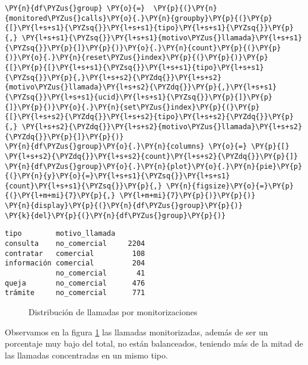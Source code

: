     \begin{tcolorbox}[breakable, size=fbox, boxrule=1pt, pad at break*=1mm,colback=cellbackground, colframe=cellborder]
\begin{Verbatim}[commandchars=\\\{\}]
\PY{n}{df\PYZus{}group} \PY{o}{=}  \PY{p}{(}\PY{n}{monitored\PYZus{}calls}\PY{o}{.}\PY{n}{groupby}\PY{p}{(}\PY{p}{[}\PY{l+s+s1}{\PYZsq{}}\PY{l+s+s1}{tipo}\PY{l+s+s1}{\PYZsq{}}\PY{p}{,} \PY{l+s+s1}{\PYZsq{}}\PY{l+s+s1}{motivo\PYZus{}llamada}\PY{l+s+s1}{\PYZsq{}}\PY{p}{]}\PY{p}{)}\PY{o}{.}\PY{n}{count}\PY{p}{(}\PY{p}{)}\PY{o}{.}\PY{n}{reset\PYZus{}index}\PY{p}{(}\PY{p}{)}\PY{p}{[}\PY{p}{[}\PY{l+s+s1}{\PYZsq{}}\PY{l+s+s1}{tipo}\PY{l+s+s1}{\PYZsq{}}\PY{p}{,}\PY{l+s+s2}{\PYZdq{}}\PY{l+s+s2}{motivo\PYZus{}llamada}\PY{l+s+s2}{\PYZdq{}}\PY{p}{,}\PY{l+s+s1}{\PYZsq{}}\PY{l+s+s1}{ucid}\PY{l+s+s1}{\PYZsq{}}\PY{p}{]}\PY{p}{]}\PY{p}{)}\PY{o}{.}\PY{n}{set\PYZus{}index}\PY{p}{(}\PY{p}{[}\PY{l+s+s2}{\PYZdq{}}\PY{l+s+s2}{tipo}\PY{l+s+s2}{\PYZdq{}}\PY{p}{,} \PY{l+s+s2}{\PYZdq{}}\PY{l+s+s2}{motivo\PYZus{}llamada}\PY{l+s+s2}{\PYZdq{}}\PY{p}{]}\PY{p}{)}
\PY{n}{df\PYZus{}group}\PY{o}{.}\PY{n}{columns} \PY{o}{=} \PY{p}{[} \PY{l+s+s2}{\PYZdq{}}\PY{l+s+s2}{count}\PY{l+s+s2}{\PYZdq{}}\PY{p}{]}
\PY{n}{df\PYZus{}group}\PY{o}{.}\PY{n}{plot}\PY{o}{.}\PY{n}{pie}\PY{p}{(}\PY{n}{y}\PY{o}{=}\PY{l+s+s1}{\PYZsq{}}\PY{l+s+s1}{count}\PY{l+s+s1}{\PYZsq{}}\PY{p}{,} \PY{n}{figsize}\PY{o}{=}\PY{p}{(}\PY{l+m+mi}{7}\PY{p}{,} \PY{l+m+mi}{7}\PY{p}{)}\PY{p}{)}
\PY{n}{display}\PY{p}{(}\PY{n}{df\PYZus{}group}\PY{p}{)}
\PY{k}{del}\PY{p}{(}\PY{n}{df\PYZus{}group}\PY{p}{)}
\end{Verbatim}
\end{tcolorbox}
    \begin{verbatim}
tipo        motivo_llamada       
consulta    no_comercial     2204
contratar   comercial         108
información comercial         204
            no_comercial       41
queja       no_comercial      476
trámite     no_comercial      771
    \end{verbatim}

    
      
\begin{figure}[!ht]
	\centering
    \caption{Distribución de llamadas por monitorizaciones}
    \label{fig:distmoni}
\end{figure}
    
 Observamos en la figura \ref{fig:distmoni} las llamadas monitorizadas, además de ser un porcentaje muy bajo del total, no están balanceados, teniendo más de la mitad de las llamadas concentradas en un mismo tipo. 
 

